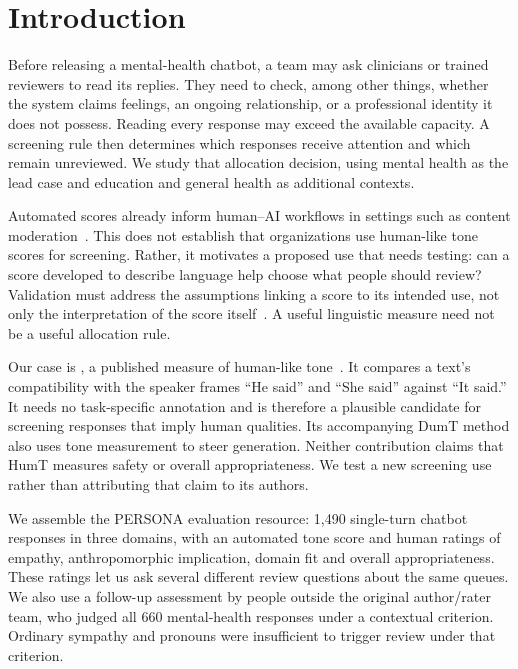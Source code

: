 \section{Introduction}
Before releasing a mental-health chatbot, a team may ask clinicians or trained reviewers to read its replies. They need to check, among other things, whether the system claims feelings, an ongoing relationship, or a professional identity it does not possess. Reading every response may exceed the available capacity. A screening rule then determines which responses receive attention and which remain unreviewed. We study that allocation decision, using mental health as the lead case and education and general health as additional contexts.

Automated scores already inform human--AI workflows in settings such as content moderation~\cite{lai2022moderation,lees2022perspective}. This does not establish that organizations use human-like tone scores for screening. Rather, it motivates a proposed use that needs testing: can a score developed to describe language help choose what people should review? Validation must address the assumptions linking a score to its intended use, not only the interpretation of the score itself~\cite{kane2013validation,coston2023validity}. A useful linguistic measure need not be a useful allocation rule.

Our case is \HumT{}, a published measure of human-like tone~\cite{cheng2025humt}. It compares a text's compatibility with the speaker frames ``He said'' and ``She said'' against ``It said.'' It needs no task-specific annotation and is therefore a plausible candidate for screening responses that imply human qualities. Its accompanying DumT method also uses tone measurement to steer generation. Neither contribution claims that HumT measures safety or overall appropriateness. We test a new screening use rather than attributing that claim to its authors.

We assemble the PERSONA evaluation resource: 1,490 single-turn chatbot responses in three domains, with an automated tone score and human ratings of empathy, anthropomorphic implication, domain fit and overall appropriateness. These ratings let us ask several different review questions about the same queues. We also use a follow-up assessment by people outside the original author/rater team, who judged all 660 mental-health responses under a contextual criterion. Ordinary sympathy and pronouns were insufficient to trigger review under that criterion.

